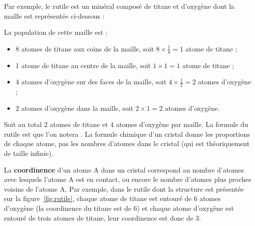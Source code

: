 \documentclass{cours}
\begin{document}
Par exemple, le rutile est un minéral composé de titane et d'oxygène dont la maille est représentée ci-dessous :
\begin{center}
\label{fig:rutile}
\end{center}

La population de  cette maille est :
\begin{itemize}
  \item 8 atomes de titane aux coins de la maille, soit $8 \times \frac{1}{8}= 1$ atome de titane ;
  \item 1 atome de titane au centre de la maille, soit $1 \times 1 = 1$ atome de titane ;
  \item 4 atomes d'oxygène sur des faces de la maille, soit $4\times\frac{1}{2}= 2$ atomes d'oxygène ;  
  \item 2 atomes d'oxygène dans la maille, soit $2\times 1 = 2$ atomes d'oxygène.
\end{itemize}
Soit au total 2 atomes de titane et 4 atomes d'oxygène par maille. La formule du rutile est  que l'on notera . La formule chimique d'un cristal donne les proportions de chaque atome, pas les nombres d'atomes dans le cristal (qui est théoriquement de taille infinie).


La \textbf{coordinence} d'un atome A dans un cristal correspond au nombre d'atomes avec lesquels l'atome A est en contact, ou encore le nombre d'atomes plus proches voisins de l'atome A. Par exemple, dans le rutile dont la structure est présentée sur la figure~\ref{fig:rutile}, chaque atome de titane est entouré de 6 atomes d'oxygène (la coordinence du titane est de 6) et chaque atome d'oxygène est entouré de trois atomes de titane, leur coordinence est donc de 3.
\end{document}
